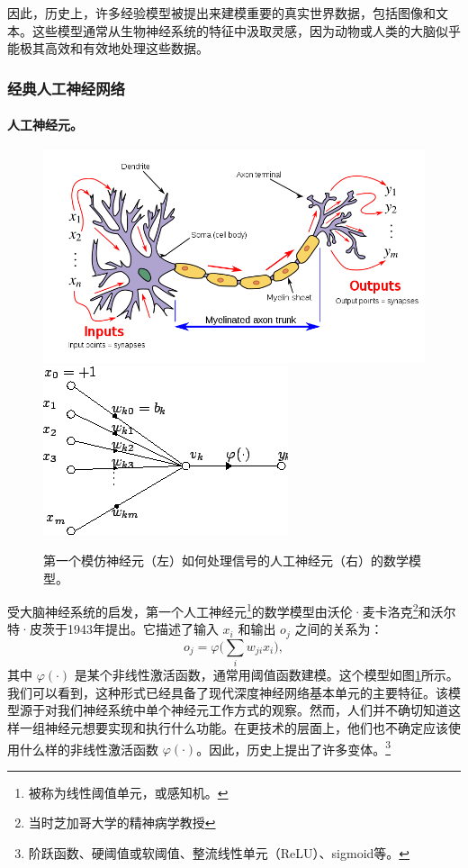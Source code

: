 \documentclass[../../book-main.tex]{subfiles}
\begin{document}
因此，历史上，许多经验模型被提出来建模重要的真实世界数据，包括图像和文本。这些模型通常从生物神经系统的特征中汲取灵感，因为动物或人类的大脑似乎能极其高效和有效地处理这些数据。

\subsubsection{经典人工神经网络}
\paragraph{人工神经元。}

\begin{figure}[t]
    \centering
\includegraphics[width=0.55\linewidth]{figures/neuron.png} \hspace{3mm}   
\includegraphics[width=0.40\linewidth]{figures/Artificial_neuron.png}
    \caption{第一个模仿神经元（左）如何处理信号的人工神经元（右）的数学模型。}
    \label{fig:neuron}
\end{figure}

受大脑神经系统的启发，第一个人工神经元\footnote{被称为线性阈值单元，或感知机。}的数学模型由沃伦·麦卡洛克\footnote{当时芝加哥大学的精神病学教授}和沃尔特·皮茨于1943年提出\cite{McCulloch-Pitts}。它描述了输入 $x_i$ 和输出 $o_j$ 之间的关系为：
\begin{equation}
    o_j = \varphi\Big( \sum_i w_{ji}x_i\Big),  
\end{equation}
其中 $\varphi(\cdot)$ 是某个非线性激活函数，通常用阈值函数建模。这个模型如图\ref{fig:neuron}所示。我们可以看到，这种形式已经具备了现代深度神经网络基本单元的主要特征。该模型源于对我们神经系统中单个神经元工作方式的观察。然而，人们并不确切知道这样一组神经元想要实现和执行什么功能。在更技术的层面上，他们也不确定应该使用什么样的非线性激活函数 $\varphi(\cdot)$。因此，历史上提出了许多变体。\footnote{阶跃函数、硬阈值或软阈值、整流线性单元（ReLU）、sigmoid等。
}
\end{document}
